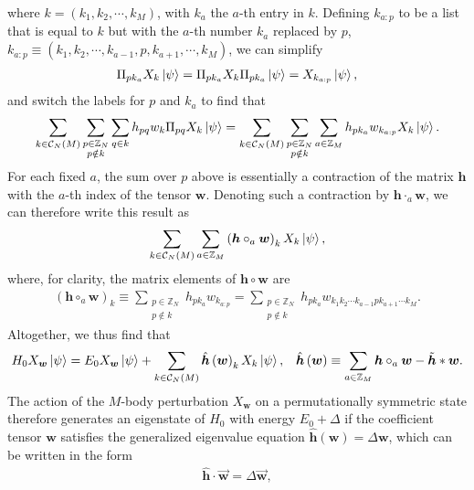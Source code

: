 \documentclass[nofootinbib,notitlepage,11pt]{revtex4-2}
\newcommand{\p}[1]{\left(#1\right)} %
\renewcommand{\c}{\cdot} %
\newcommand{\m}{\bm} %
\renewcommand{\v}{\vec} %
\newcommand{\1}{\mathds{1}}
\newcommand{\C}{\mathcal{C}}
\newcommand{\ZZ}{\mathbb{Z}}
\begin{document}
where $k=\p{k_1,k_2,\cdots,k_M}$, with $k_a$ the $a$-th entry in $k$.
Defining $k_{a:p}$ to be a list that is equal to $k$ but with the
$a$-th number $k_a$ replaced by $p$,
$k_{a:p}\equiv\p{k_1,k_2,\cdots,k_{a-1},p,k_{a+1},\cdots,k_M}$, we can
simplify
\begin{align}
  \Pi_{p k_a} X_k \ket\psi
  = \Pi_{p k_a} X_k \Pi_{p k_a} \ket\psi
  = X_{k_{a:p}}\ket\psi,
\end{align}
and switch the labels for $p$ and $k_a$ to find that
\begin{align}
  \sum_{k\in\C_N\p{M}} \sum_{\substack{p\in\ZZ_N\\p\notin k}}
  \sum_{q\in k} h_{pq} w_k  \Pi_{pq} X_k \ket\psi
  = \sum_{k\in\C_N\p{M}} \sum_{\substack{p\in\ZZ_N\\p\notin k}}
  \sum_{a\in\ZZ_M} h_{pk_a} w_{k_{a:p}} X_k \ket\psi.
\end{align}
For each fixed $a$, the sum over $p$ above is essentially a
contraction of the matrix $\m h$ with the $a$-th index of the tensor
$\m w$.  Denoting such a contraction by $\m h\c_a\m w$, we can
therefore write this result as
\begin{align}
  \sum_{k\in\C_N\p{M}} \sum_{a\in\ZZ_M}
  \p{\m h \circ_a \m w}_k X_k \ket\psi,
\end{align}
where, for clarity, the matrix elements of $\m h\circ\m w$ are
\begin{align}
  \p{\m h \circ_a \m w}_k
  \equiv \sum_{\substack{p\in\ZZ_N\\p\notin k}} h_{pk_a} w_{k_{a:p}}
  = \sum_{\substack{p\in\ZZ_N\\p\notin k}}
  h_{pk_a} w_{k_1 k_2 \cdots k_{a-1} p k_{a+1} \cdots k_M}.
\end{align}
Altogether, we thus find that
\begin{align}
  H_0 X_{\m w} \ket\psi
  = E_0 X_{\m w} \ket\psi + \sum_{k\in\C_N\p{M}}
  \hat{\m h}\p{\m w}_k X_k \ket\psi,
  &&
  \hat{\m h}\p{\m w}
  \equiv \sum_{a\in\ZZ_M} \m h \circ_a \m w - \tilde{\m h} * \m w.
  \label{eq:diagnosis_end}
\end{align}
The action of the $M$-body perturbation $X_{\m w}$ on a
permutationally symmetric state therefore generates an eigenstate of
$H_0$ with energy $E_0+\Delta$ if the coefficient tensor $\m w$
satisfies the generalized eigenvalue equation
$\hat{\m h}\p{\m w} = \Delta \m w$, which can be written in the form
\begin{align}
  \hat{\m h} \c \v{\m w} = \Delta \v{\m w},
  \label{eq:multi_body_eig_mat}
\end{align}
\end{document}
